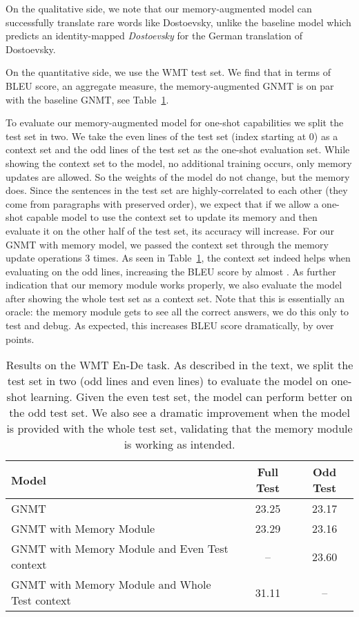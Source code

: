 \documentclass{article} \usepackage{iclr2017_conference,times}
\begin{document}
On the qualitative side, we note that our memory-augmented 
model can successfully translate rare words like Dostoevsky, unlike the baseline model 
which predicts an identity-mapped \emph{Dostoevsky} for the 
German translation of Dostoevsky.

On the quantitative side, we use the WMT test set.
We find that in terms of BLEU score, an aggregate measure, 
the memory-augmented GNMT is on par
with the baseline GNMT, see Table~\ref{tab:translate}.  

To evaluate our memory-augmented model for
one-shot capabilities we split the test set in two.  
We take the even
lines of the test set (index starting at 0) as a context set and the
odd lines of the test set as the one-shot evaluation set.
While showing the context set to the model, no 
additional training occurs, only memory updates are allowed.
So the weights of the model do not change, but the memory does.
Since the sentences in the test set are highly-correlated to each other
(they come from paragraphs with preserved order),
we expect that if we allow a one-shot capable model to use the context set to update its
memory and then evaluate it on the other half of the test set,
its accuracy will increase.
For our GNMT with memory model, we passed the context set through
the memory update operations 3 times.
As seen in Table~\ref{tab:translate}, the context set indeed
helps when evaluating on the odd lines, increasing
the BLEU score by almost . 
As further indication that our memory module works properly, 
we also evaluate the model after showing the whole test set
as a context set. Note that this is essentially an oracle:
the memory module gets to see all the correct answers,
we do this only to test and debug.
As expected, this increases BLEU score dramatically, by over  points.

\begin{table}\caption{Results on the WMT En-De task.
As described in the text, we split the test set in two (odd lines and even lines) to evaluate the
model on one-shot learning.  Given the even test set, the model
can perform better on the odd test set.  We also see a dramatic improvement when
the model is provided with the whole test set, validating that the memory module
is working as intended.}
\begin{center}
\begin{tabular}{|l||c|c|}
\hline
{\bf Model}   & Full Test & Odd Test \\ \hline
GNMT                                            & 23.25 & 23.17 \\ \hline
GNMT with Memory Module                         & 23.29 & 23.16 \\ \hline
GNMT with Memory Module and Even Test context   & --    & 23.60 \\ \hline
GNMT with Memory Module and Whole Test context  & 31.11 & -- \\ \hline
\end{tabular}
\end{center}
\label{tab:translate}
\end{table}
\end{document}
